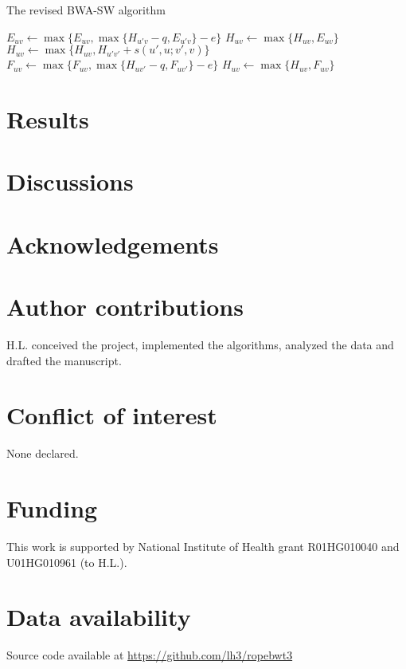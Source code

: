 \documentclass[webpdf,contemporary,large,namedate]{oup-authoring-template}%
\begin{document}
\begin{algorithm}
	\caption{The revised BWA-SW algorithm}\label{algo:bwa-sw}
	\begin{algorithmic}[1]
						\State $E_{uv}\gets\max\{E_{uv},\max\{H_{u'v}-q,E_{u'v}\}-e\}$
						\State $H_{uv}\gets\max\{H_{uv},E_{uv}\}$
					\EndFor
							\State $H_{uv}\gets \max\{H_{uv},H_{u'v'}+s(u',u;v',v)\}$
						\EndFor
					\EndFor
				\EndFor
						\State $F_{uv}\gets\max\{F_{uv},\max\{H_{uv'}-q,F_{uv'}\}-e\}$
						\State $H_{uv}\gets\max\{H_{uv},F_{uv}\}$
					\EndFor
				\EndFor
			\EndFor
		\EndProcedure
	\end{algorithmic}
\end{algorithm}

\section{Results}

\section{Discussions}

\section*{Acknowledgements}

\section*{Author contributions}

H.L. conceived the project, implemented the algorithms, analyzed the data and drafted the manuscript.

\section*{Conflict of interest}

None declared.

\section*{Funding}

This work is supported by National Institute of Health grant R01HG010040 and U01HG010961 (to H.L.).

\section*{Data availability}

Source code available at \url{https://github.com/lh3/ropebwt3}


{\sffamily\small
}
\end{document}
